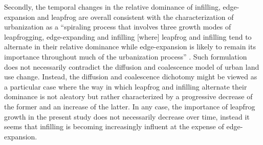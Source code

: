 \documentclass[10pt,letterpaper]{article}
\begin{document}
Secondly, the temporal changes in the relative dominance of infilling, edge-expansion and leapfrog are overall consistent with the characterization of urbanization as a ``spiraling process that involves three growth modes of leapfrogging, edge-expanding and infilling [where] leapfrog and infilling tend to alternate in their relative dominance while edge-expansion is likely to remain its importance throughout much of the urbanization process'' \cite{li2013quantifying}. %
Such formulation does not necessarily contradict the diffusion and coalescence model of urban land use change.
Instead, the diffusion and coalescence dichotomy might be viewed as a particular case where the way in which leapfrog and infilling alternate their dominance is not aleatory but rather characterized by a progressive decrease of the former and an increase of the latter.
In any case, the importance of leapfrog growth in the present study does not necessarily decrease over time, instead it seems that infilling is becoming increasingly influent at the expense of edge-expansion.
\end{document}
